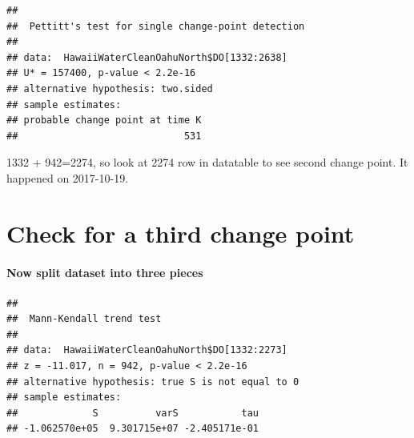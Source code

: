 \documentclass[12pt,]{article}
\newenvironment{Shaded}{\begin{snugshade}}{\end{snugshade}}
\newcommand{\KeywordTok}[1]{\textcolor[rgb]{0.13,0.29,0.53}{\textbf{#1}}}
\newcommand{\DecValTok}[1]{\textcolor[rgb]{0.00,0.00,0.81}{#1}}
\newcommand{\OperatorTok}[1]{\textcolor[rgb]{0.81,0.36,0.00}{\textbf{#1}}}
\newcommand{\NormalTok}[1]{#1}
\let\oldparagraph\paragraph
\renewcommand{\paragraph}[1]{\oldparagraph{#1}\mbox{}}
\begin{document}
\begin{Shaded}
\end{Shaded}

\begin{verbatim}
## 
##  Pettitt's test for single change-point detection
## 
## data:  HawaiiWaterCleanOahuNorth$DO[1332:2638]
## U* = 157400, p-value < 2.2e-16
## alternative hypothesis: two.sided
## sample estimates:
## probable change point at time K 
##                             531
\end{verbatim}

1332 + 942=2274, so look at 2274 row in datatable to see second change
point. It happened on 2017-10-19.

\section{Check for a third change
point}\label{check-for-a-third-change-point}

\paragraph{Now split dataset into three
pieces}\label{now-split-dataset-into-three-pieces}

\begin{Shaded}
\end{Shaded}

\begin{verbatim}
## 
##  Mann-Kendall trend test
## 
## data:  HawaiiWaterCleanOahuNorth$DO[1332:2273]
## z = -11.017, n = 942, p-value < 2.2e-16
## alternative hypothesis: true S is not equal to 0
## sample estimates:
##             S          varS           tau 
## -1.062570e+05  9.301715e+07 -2.405171e-01
\end{verbatim}

\begin{Shaded}
\end{Shaded}
\end{document}
